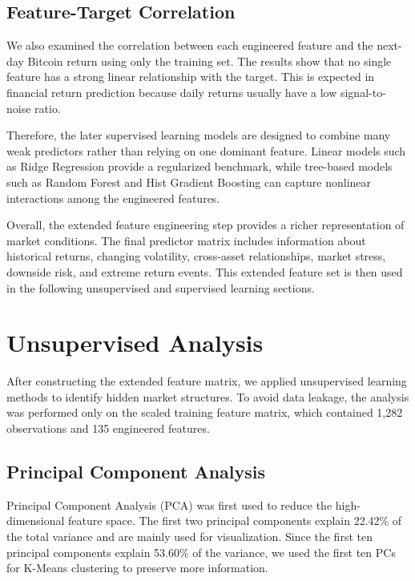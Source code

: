 \documentclass[12pt]{article}
\begin{document}
\subsection{Feature-Target Correlation}

We also examined the correlation between each engineered feature and the next-day Bitcoin return using only the training set. The results show that no single feature has a strong linear relationship with the target. This is expected in financial return prediction because daily returns usually have a low signal-to-noise ratio.

Therefore, the later supervised learning models are designed to combine many weak predictors rather than relying on one dominant feature. Linear models such as Ridge Regression provide a regularized benchmark, while tree-based models such as Random Forest and Hist Gradient Boosting can capture nonlinear interactions among the engineered features.

Overall, the extended feature engineering step provides a richer representation of market conditions. The final predictor matrix includes information about historical returns, changing volatility, cross-asset relationships, market stress, downside risk, and extreme return events. This extended feature set is then used in the following unsupervised and supervised learning sections.


\section{Unsupervised Analysis}

After constructing the extended feature matrix, we applied unsupervised learning methods to identify hidden market structures. To avoid data leakage, the analysis was performed only on the scaled training feature matrix, which contained 1,282 observations and 135 engineered features.

\subsection{Principal Component Analysis}

Principal Component Analysis (PCA) was first used to reduce the high-dimensional feature space. The first two principal components explain 22.42\% of the total variance and are mainly used for visualization. Since the first ten principal components explain 53.60\% of the variance, we used the first ten PCs for K-Means clustering to preserve more information.
\end{document}
